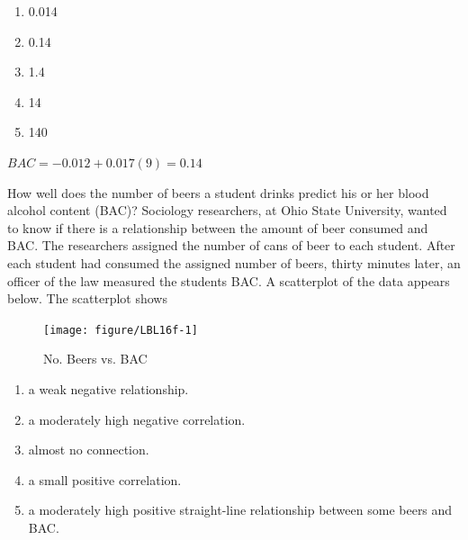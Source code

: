 \documentclass[11pt, chapterprefix=true]{scrbook}\usepackage[]{graphicx}\usepackage[]{color}
\newenvironment{knitrout}{}{} %
\begin{document}
\begin{exercises}
\begin{exercise}
    \begin{enumerate}
    \item 0.014
    \item 0.14
    \item 1.4
    \item 14
    \item 140
    \end{enumerate}
    \vspace{5mm}

  \end{exercise}
  \vspace{2mm}
  \begin{solution}
     $ BAC = -0.012 + 0.017 (9) = 0.14 $
  \end{solution}

  \begin{exercise} %

    How well does the number of beers a student drinks predict his or her
blood alcohol content (BAC)? Sociology researchers, at Ohio State University, wanted to know if there is a relationship between the amount of beer consumed and BAC. The researchers assigned the number of cans of beer to each student. After each student had consumed the assigned number of beers,  thirty minutes later, an officer of the law measured the students BAC. \cite{OSU2016}
A scatterplot of the data appears below.  The scatterplot shows

\begin{knitrout}\footnotesize
{}\color{fgcolor}\begin{figure}[ht]

{\centering \texttt{[image: figure/LBL16f-1]} 

}

\caption[No]{No. Beers vs. BAC}\label{fig:LBL16f}
\end{figure}


\end{knitrout}

      \begin{enumerate}
      \item a weak negative relationship.
      \item a moderately high negative correlation.
      \item almost no connection.
      \item a small positive correlation.
      \item a moderately high positive straight-line relationship between some beers and \\ BAC.
      \end{enumerate}
      \vspace{5mm}


\end{exercise}
\end{exercises}
\end{document}
